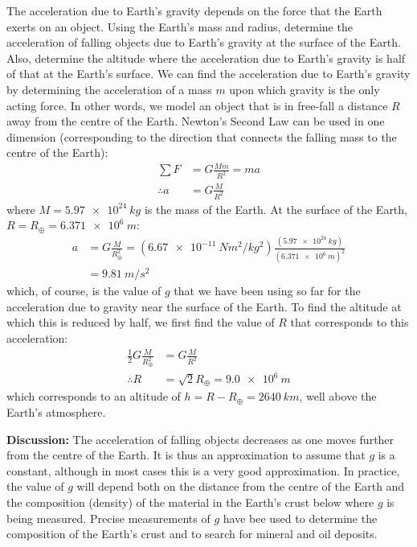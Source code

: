\begin{example}{\label{ex:gravity:gofr}The acceleration due to Earth's gravity depends on the force that the Earth exerts on an object. Using the Earth's mass and radius, determine the acceleration of falling objects due to Earth's gravity at the surface of the Earth. Also, determine the altitude where the acceleration due to Earth's gravity is half of that at the Earth's surface.}
We can find the acceleration due to Earth's gravity by determining the acceleration of a mass $m$ upon which gravity is the only acting force. In other words, we model an object that is in free-fall a distance $R$ away from the centre of the Earth. Newton's Second Law can be used in one dimension (corresponding to the direction that connects the falling mass to the centre of the Earth):
\begin{align*}
\sum F &= G\frac{Mm}{R^2}=ma\\
\therefore a&=G\frac{M}{R^2}
\end{align*}
where $M=\SI{5.97e24}{kg}$ is the mass of the Earth. At the surface of the Earth, $R=R_\oplus=\SI{6.371e6}{m}$:
\begin{align*}
a&=G\frac{M}{R_\oplus^2}=(\SI{6.67e-11}{Nm^2/kg^2})\frac{(\SI{5.97e24}{kg})}{(\SI{6.371e6}{m})^2}\\
&=\SI{9.81}{m/s^2}
\end{align*}
which, of course, is the value of $g$ that we have been using so far for the acceleration due to gravity near the surface of the Earth. To find the altitude at which this is reduced by half, we first find the value of $R$ that corresponds to this acceleration:
\begin{align*}
\frac{1}{2}G\frac{M}{R_\oplus^2}&=G\frac{M}{R^2}\\
\therefore R &=\sqrt{2}R_\oplus = \SI{9.0e6}{m}
\end{align*}
which corresponds to an altitude of $h=R-R_\oplus=\SI{2640}{km}$, well above the Earth's atmosphere.

\textbf{Discussion:} The acceleration of falling objects decreases as one moves further from the centre of the Earth. It is thus an approximation to assume that $g$ is a constant, although in most cases this is a very good approximation. In practice, the value of $g$ will depend both on the distance from the centre of the Earth and the composition (density) of the material in the Earth's crust below where $g$ is being measured. Precise measurements of $g$ have bee used to determine the composition of the Earth's crust and to search for mineral and oil deposits.
\end{example}

